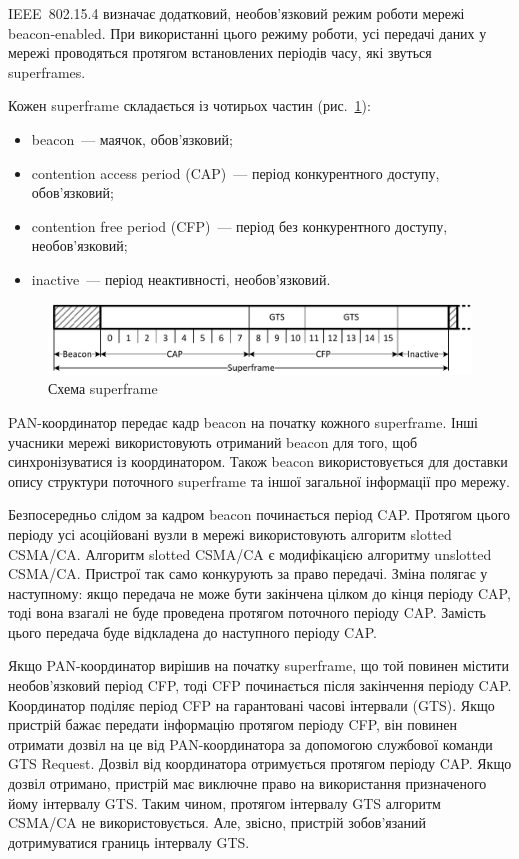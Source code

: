 \documentclass[a4paper,ukrainian,utf8,nocolumnsxix,floatsection,equationsection]{eskdtext}
\newcommand{\figref}[1]{рис.~\ref{#1}}
\newcommand{\iee}[0]{IEEE~802.15.4\xspace}
\newcommand{\csma}[0]{CSMA/CA\xspace}
\newcommand{\ucsma}[0]{unslotted \csma\xspace}
\newcommand{\scsma}[0]{slotted \csma\xspace}
\newcommand{\bem}[0]{beacon-enabled\xspace}
\begin{document}
\iee визначає додатковий, необов'язковий режим роботи мережі \bem. При використанні цього режиму роботи, усі передачі даних у мережі проводяться протягом встановлених періодів часу, які звуться superframes. 

Кожен superframe складається із чотирьох частин (\figref{fig:superframe}):

\begin{itemize}
	\item beacon~--- маячок, обов'язковий;
	\item contention access period (CAP)~--- період конкурентного доступу, обов'язковий;
	\item contention free period (CFP)~--- період без конкурентного доступу, необов'язковий;
	\item inactive~--- період неактивності, необов'язковий.
\end{itemize}

\begin{figure}[htbp]
	\centering
	\includegraphics[width=\textwidth]{img/superframe.pdf}
	\caption{\label{fig:superframe}Схема superframe}
\end{figure}

PAN-координатор передає кадр beacon на початку кожного superframe. Інші учасники мережі використовують отриманий beacon для того, щоб синхронізуватися із координатором. Також beacon використовується для доставки опису структури поточного superframe та іншої загальної інформації про мережу. 

Безпосередньо слідом за кадром beacon починається період CAP. Протягом цього періоду усі асоційовані вузли в мережі використовують алгоритм \scsma. Алгоритм \scsma є модифікацією алгоритму \ucsma. Пристрої так само конкурують за право передачі. Зміна полягає у наступному: якщо передача не може бути закінчена цілком до кінця періоду CAP, тоді вона взагалі не буде проведена протягом поточного періоду CAP. Замість цього передача буде відкладена до наступного періоду CAP. 

Якщо PAN-координатор вирішив на початку superframe, що той повинен містити необов'язковий період CFP, тоді CFP починається після закінчення періоду CAP. Координатор поділяє період CFP на гарантовані часові інтервали (GTS). Якщо пристрій бажає передати інформацію протягом періоду CFP, він повинен отримати дозвіл на це від PAN-координатора за допомогою службової команди GTS Request. Дозвіл від координатора отримується протягом періоду CAP. Якщо дозвіл отримано, пристрій має виключне право на використання призначеного йому інтервалу GTS. Таким чином, протягом інтервалу GTS алгоритм \csma не використовується. Але, звісно, пристрій зобов'язаний дотримуватися границь інтервалу GTS. 
\end{document}
